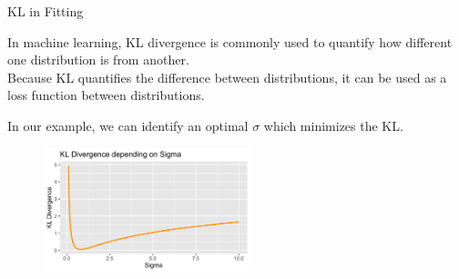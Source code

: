 \documentclass[11pt,compress,t,notes=noshow, xcolor=table]{beamer}
\begin{document}
\begin{vbframe} {KL in Fitting}

In machine learning, KL divergence is commonly used to quantify how different one distribution is from another.\\

Because KL quantifies the difference between distributions, it can be used as a loss function between distributions. %
\lz

In our example, we can identify an optimal $\sigma$ which minimizes the KL.
\begin{figure}
\includegraphics[width = 6cm ]{figure/kl_norm_lp_sigma.png} 
\end{figure}




\framebreak



\end{vbframe}
\end{document}
